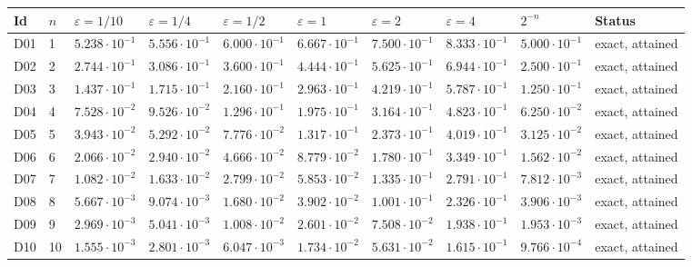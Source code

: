 {\scriptsize\setlength{\tabcolsep}{3pt}
\begin{longtable}{@{}llllllllll@{}}
\toprule
Id & $n$ & $\varepsilon=1/10$ & $\varepsilon=1/4$ & $\varepsilon=1/2$ & $\varepsilon=1$ & $\varepsilon=2$ & $\varepsilon=4$ & $2^{-n}$ & Status \\
\midrule\endhead
\bottomrule\endfoot
D01 & 1 & $5.238\cdot 10^{-1}$ & $5.556\cdot 10^{-1}$ & $6.000\cdot 10^{-1}$ & $6.667\cdot 10^{-1}$ & $7.500\cdot 10^{-1}$ & $8.333\cdot 10^{-1}$ & $5.000\cdot 10^{-1}$ & exact, attained \\
D02 & 2 & $2.744\cdot 10^{-1}$ & $3.086\cdot 10^{-1}$ & $3.600\cdot 10^{-1}$ & $4.444\cdot 10^{-1}$ & $5.625\cdot 10^{-1}$ & $6.944\cdot 10^{-1}$ & $2.500\cdot 10^{-1}$ & exact, attained \\
D03 & 3 & $1.437\cdot 10^{-1}$ & $1.715\cdot 10^{-1}$ & $2.160\cdot 10^{-1}$ & $2.963\cdot 10^{-1}$ & $4.219\cdot 10^{-1}$ & $5.787\cdot 10^{-1}$ & $1.250\cdot 10^{-1}$ & exact, attained \\
D04 & 4 & $7.528\cdot 10^{-2}$ & $9.526\cdot 10^{-2}$ & $1.296\cdot 10^{-1}$ & $1.975\cdot 10^{-1}$ & $3.164\cdot 10^{-1}$ & $4.823\cdot 10^{-1}$ & $6.250\cdot 10^{-2}$ & exact, attained \\
D05 & 5 & $3.943\cdot 10^{-2}$ & $5.292\cdot 10^{-2}$ & $7.776\cdot 10^{-2}$ & $1.317\cdot 10^{-1}$ & $2.373\cdot 10^{-1}$ & $4.019\cdot 10^{-1}$ & $3.125\cdot 10^{-2}$ & exact, attained \\
D06 & 6 & $2.066\cdot 10^{-2}$ & $2.940\cdot 10^{-2}$ & $4.666\cdot 10^{-2}$ & $8.779\cdot 10^{-2}$ & $1.780\cdot 10^{-1}$ & $3.349\cdot 10^{-1}$ & $1.562\cdot 10^{-2}$ & exact, attained \\
D07 & 7 & $1.082\cdot 10^{-2}$ & $1.633\cdot 10^{-2}$ & $2.799\cdot 10^{-2}$ & $5.853\cdot 10^{-2}$ & $1.335\cdot 10^{-1}$ & $2.791\cdot 10^{-1}$ & $7.812\cdot 10^{-3}$ & exact, attained \\
D08 & 8 & $5.667\cdot 10^{-3}$ & $9.074\cdot 10^{-3}$ & $1.680\cdot 10^{-2}$ & $3.902\cdot 10^{-2}$ & $1.001\cdot 10^{-1}$ & $2.326\cdot 10^{-1}$ & $3.906\cdot 10^{-3}$ & exact, attained \\
D09 & 9 & $2.969\cdot 10^{-3}$ & $5.041\cdot 10^{-3}$ & $1.008\cdot 10^{-2}$ & $2.601\cdot 10^{-2}$ & $7.508\cdot 10^{-2}$ & $1.938\cdot 10^{-1}$ & $1.953\cdot 10^{-3}$ & exact, attained \\
D10 & 10 & $1.555\cdot 10^{-3}$ & $2.801\cdot 10^{-3}$ & $6.047\cdot 10^{-3}$ & $1.734\cdot 10^{-2}$ & $5.631\cdot 10^{-2}$ & $1.615\cdot 10^{-1}$ & $9.766\cdot 10^{-4}$ & exact, attained \\

\end{longtable}}
